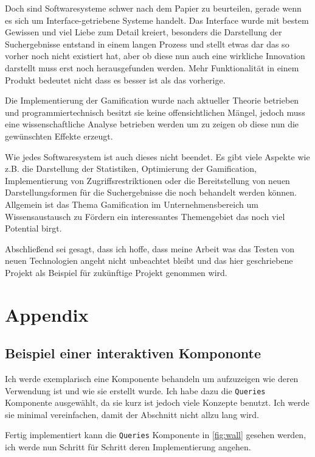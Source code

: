 \documentclass[12pt,twoside]{book}
\begin{document}
Doch sind Softwaresysteme schwer nach dem Papier zu beurteilen, gerade wenn es sich um Interface-getriebene Systeme handelt. Das Interface wurde mit bestem Gewissen und viel Liebe zum Detail kreiert, besonders die Darstellung der Suchergebnisse entstand in einem langen Prozess und stellt etwas dar das so vorher noch nicht existiert hat, aber ob diese nun auch eine wirkliche Innovation darstellt muss erst noch herausgefunden werden. Mehr Funktionalität in einem Produkt bedeutet nicht dass es besser ist als das vorherige.

Die Implementierung der Gamification wurde nach aktueller Theorie betrieben und programmiertechnisch besitzt sie keine offensichtlichen Mängel, jedoch muss eine wissenschaftliche Analyse betrieben werden um zu zeigen ob diese nun die gewünschten Effekte erzeugt.

Wie jedes Softwaresystem ist auch dieses nicht beendet. Es gibt viele Aspekte wie z.B. die Darstellung der Statistiken, Optimierung der Gamification, Implementierung von Zugriffsrestriktionen oder  die Bereitstellung von neuen Darstellungsformen für die Suchergebnisse die noch behandelt werden können. Allgemein ist das Thema Gamification im Unternehmensbereich um Wissensaustausch zu Fördern ein interessantes Themengebiet das noch viel Potential birgt.

Abschließend sei gesagt, dass ich hoffe, dass meine Arbeit was das Testen von neuen Technologien angeht nicht unbeachtet bleibt und das hier geschriebene Projekt als Beispiel für zukünftige Projekt genommen wird.

\chapter{Appendix}

\section{Beispiel einer interaktiven Kompononte}\label{chap:appendix:component}

Ich werde exemplarisch eine Komponente behandeln um aufzuzeigen wie deren Verwendung ist und wie sie erstellt wurde. Ich habe dazu die \texttt{Queries} Komponente ausgewählt, da sie kurz ist jedoch viele Konzepte benutzt. Ich werde sie minimal vereinfachen, damit der Abschnitt nicht allzu lang wird.

Fertig implementiert kann die \texttt{Queries} Komponente in \ref{fig:wall} gesehen werden, ich werde nun Schritt für Schritt deren Implementierung angehen.
\end{document}

